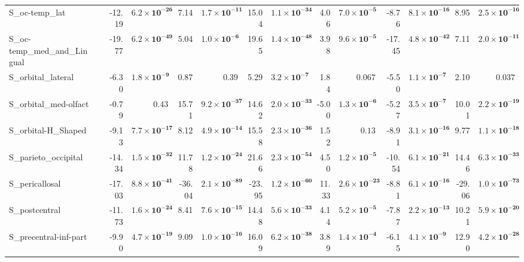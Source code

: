 {\begin{longtable}{llrrrrrrrrrrrr}
S\_oc-temp\_lat &  & -12.19 & $\mathbf{6.2{\times}10^{-26}}$ & 7.14 & $\mathbf{1.7{\times}10^{-11}}$ & 15.04 & $\mathbf{1.1{\times}10^{-34}}$ & 4.06 & $\mathbf{7.0{\times}10^{-5}}$ & -8.76 & $\mathbf{8.1{\times}10^{-16}}$ & 8.95 & $\mathbf{2.5{\times}10^{-16}}$ \\
S\_oc-temp\_med\_and\_Lingual &  & -19.77 & $\mathbf{6.2{\times}10^{-49}}$ & 5.04 & $\mathbf{1.0{\times}10^{-6}}$ & 19.65 & $\mathbf{1.4{\times}10^{-48}}$ & 3.98 & $\mathbf{9.6{\times}10^{-5}}$ & -17.45 & $\mathbf{4.8{\times}10^{-42}}$ & 7.11 & $\mathbf{2.0{\times}10^{-11}}$ \\
S\_orbital\_lateral &  & -6.30 & $\mathbf{1.8{\times}10^{-9}}$ & 0.87 & $0.39$ & 5.29 & $\mathbf{3.2{\times}10^{-7}}$ & 1.84 & $0.067$ & -5.50 & $\mathbf{1.1{\times}10^{-7}}$ & 2.10 & $0.037$ \\
S\_orbital\_med-olfact &  & -0.79 & $0.43$ & 15.71 & $\mathbf{9.2{\times}10^{-37}}$ & 14.62 & $\mathbf{2.0{\times}10^{-33}}$ & -5.00 & $\mathbf{1.3{\times}10^{-6}}$ & -5.27 & $\mathbf{3.5{\times}10^{-7}}$ & 10.01 & $\mathbf{2.2{\times}10^{-19}}$ \\
S\_orbital-H\_Shaped &  & -9.13 & $\mathbf{7.7{\times}10^{-17}}$ & 8.12 & $\mathbf{4.9{\times}10^{-14}}$ & 15.58 & $\mathbf{2.3{\times}10^{-36}}$ & 1.52 & $0.13$ & -8.91 & $\mathbf{3.1{\times}10^{-16}}$ & 9.77 & $\mathbf{1.1{\times}10^{-18}}$ \\
S\_parieto\_occipital &  & -14.34 & $\mathbf{1.5{\times}10^{-32}}$ & 11.78 & $\mathbf{1.2{\times}10^{-24}}$ & 21.66 & $\mathbf{2.3{\times}10^{-54}}$ & 4.50 & $\mathbf{1.2{\times}10^{-5}}$ & -10.54 & $\mathbf{6.1{\times}10^{-21}}$ & 14.46 & $\mathbf{6.3{\times}10^{-33}}$ \\
S\_pericallosal &  & -17.03 & $\mathbf{8.8{\times}10^{-41}}$ & -36.04 & $\mathbf{2.1{\times}10^{-89}}$ & -23.95 & $\mathbf{1.2{\times}10^{-60}}$ & 11.33 & $\mathbf{2.6{\times}10^{-23}}$ & -8.81 & $\mathbf{6.1{\times}10^{-16}}$ & -29.06 & $\mathbf{1.0{\times}10^{-73}}$ \\
S\_postcentral &  & -11.73 & $\mathbf{1.6{\times}10^{-24}}$ & 8.41 & $\mathbf{7.6{\times}10^{-15}}$ & 14.48 & $\mathbf{5.6{\times}10^{-33}}$ & 4.14 & $\mathbf{5.2{\times}10^{-5}}$ & -7.87 & $\mathbf{2.2{\times}10^{-13}}$ & 10.21 & $\mathbf{5.9{\times}10^{-20}}$ \\
S\_precentral-inf-part &  & -9.90 & $\mathbf{4.7{\times}10^{-19}}$ & 9.09 & $\mathbf{1.0{\times}10^{-16}}$ & 16.09 & $\mathbf{6.2{\times}10^{-38}}$ & 3.89 & $\mathbf{1.4{\times}10^{-4}}$ & -6.15 & $\mathbf{4.1{\times}10^{-9}}$ & 12.90 & $\mathbf{4.2{\times}10^{-28}}$ \\

\end{longtable}}

